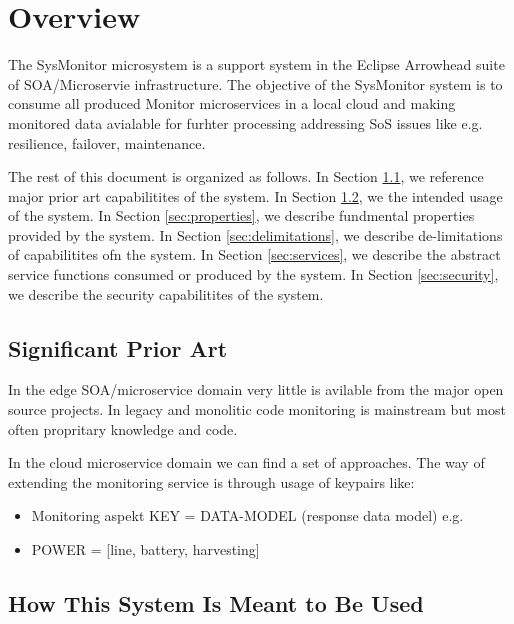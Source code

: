 \documentclass[a4paper]{arrowhead}
\begin{document}
\newpage

\tableofcontents
\newpage

\section{Overview}
\label{sec:overview}
  The SysMonitor microsystem is a support system in the Eclipse
    Arrowhead suite of SOA/Microservie infrastructure. The objective
    of the SysMonitor system is to consume all produced Monitor
    microservices in a local cloud and making monitored data avialable
    for furhter processing addressing SoS issues like e.g. resilience,
    failover, maintenance. 
    
The rest of this document is organized as follows.
In Section \ref{sec:prior_art}, we reference major prior art capabilitites
of the system.
In Section \ref{sec:use}, we the intended usage of the system.
In Section \ref{sec:properties}, we describe fundmental properties
provided by the system.
In Section \ref{sec:delimitations}, we describe de-limitations of capabilitites
ofn the system.
In Section \ref{sec:services}, we describe the abstract service
functions consumed or produced by the system.
In Section \ref{sec:security}, we describe the security capabilitites
of the system.


\subsection{Significant Prior Art}
\label{sec:prior_art}

In the edge SOA/microservice domain very little is avilable from the
major open source projects. In legacy and monolitic code monitoring is
mainstream but most often propritary knowledge and code.

In the cloud microservice domain we can find a set of approaches. The
way of extending the monitoring service is through usage of keypairs
like:
\begin{itemize}
  \item Monitoring aspekt KEY = DATA-MODEL (response data model) e.g.
  \item POWER = [line, battery, harvesting]
\end{itemize}
  

\subsection{How This System Is Meant to Be Used}
\label{sec:use}
\end{document}
